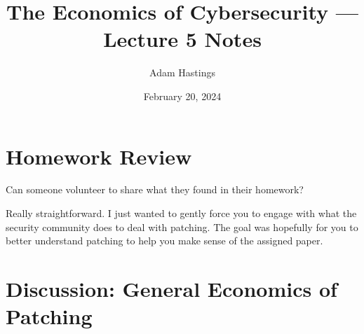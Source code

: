 \documentclass[11pt]{article}
\title{The Economics of Cybersecurity --- Lecture 5 Notes}
\date{February 20, 2024}
\author{Adam Hastings}
\begin{document}
\maketitle


\section*{Homework Review}

Can someone volunteer to share what they found in their homework?

Really straightforward. I just wanted to gently force you to engage with what the security community does to deal with patching. The goal was hopefully for you to better understand patching to help you make sense of the assigned paper. 

\section*{Discussion: General Economics of Patching}
\end{document}
